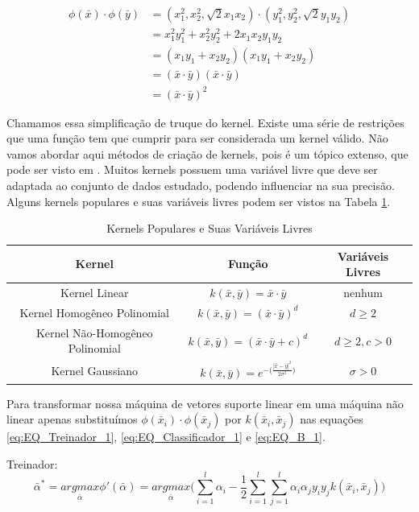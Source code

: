 \begin{equation} \label{eq:phiSimplificado}
\begin{split}
\phi(\bar{x})\cdot \phi(\bar{y}) &= (x_1^2,x_2^2,\sqrt{2}x_1x_2) \cdot (y_1^2,y_2^2,\sqrt{2}y_1y_2) \\
&=x_1^2y_1^2+x_2^2y_2^2+2x_1x_2y_1y_2 \\
&=(x_1y_1+x_2y_2)(x_1y_1+x_2y_2) \\
&=(\bar{x}\cdot\bar{y})(\bar{x}\cdot\bar{y}) \\
&=(\bar{x}\cdot\bar{y})^2
\end{split}
\end{equation}

Chamamos essa simplificação de truque do kernel. Existe uma série de restrições que uma função tem que cumprir para ser considerada um kernel válido. Não vamos abordar aqui métodos de criação de kernels, pois é um tópico extenso, que pode ser visto em \cite{art:LIVRO_SVM}. Muitos kernels possuem uma variável livre que deve ser adaptada ao conjunto de dados estudado, podendo influenciar na sua precisão. Alguns kernels populares e suas variáveis livres podem ser vistos na Tabela \ref{tab:Kernels}.
\begin{table}
    \centering
    \caption{Kernels Populares e Suas Variáveis Livres}
    \label{tab:Kernels}
    \begin{tabular}{|c|c|c|} \hline
            Kernel & Função & Variáveis Livres \\ \hline
        Kernel Linear & $k(\bar{x},\bar{y})=\bar{x}\cdot\bar{y}$ & nenhum \\
        Kernel Homogêneo Polinomial & $k(\bar{x},\bar{y})=(\bar{x}\cdot\bar{y})^d$ & $d\ge2$ \\
        Kernel Não-Homogêneo Polinomial & $k(\bar{x},\bar{y})=(\bar{x}\cdot\bar{y}+c)^d$ & $d\ge2, c > 0$ \\
        Kernel Gaussiano & $k(\bar{x},\bar{y})=e^{-\big(\frac{|\bar{x}-\bar{y}|^2}{2\sigma^2}\big)}$ & $\sigma>0$ \\ \hline
    \end{tabular}
\end{table}

Para transformar nossa máquina de vetores suporte linear em uma máquina não linear apenas substituímos $\phi(\bar{x}_i) \cdot \phi ( \bar{x}_j )$ por $k(\bar{x}_i,\bar{x}_j)$ nas equações \ref{eq:EQ_Treinador_1}, \ref{eq:EQ_Classificador_1} e \ref{eq:EQ_B_1}.

Treinador:
\begin{equation}
    \bar{\alpha}^* = \underset{\bar{\alpha}}{argmax}{\phi}'(\bar{\alpha}) =\underset{\bar{\alpha}}{argmax} \Bigg( \sum_{i=1}^{l}\alpha_i - \frac{1}{2}\sum_{i=1}^{l}\sum_{j=1}^{l}\alpha_i \alpha_j y_i y_j k(\bar{x}_i,\bar{x}_j) \Bigg)
    \label{eq:EQ_Treinador_2}
\end{equation}

